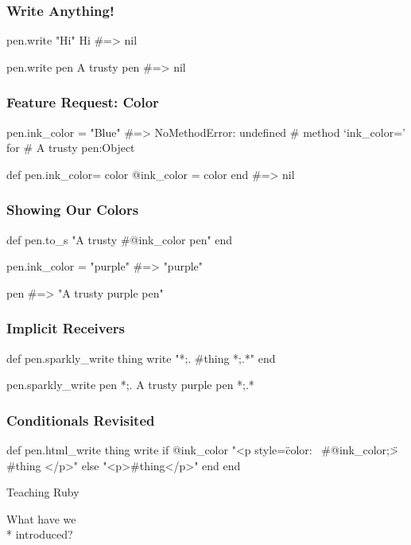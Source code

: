 \documentclass[20pt]{beamer}
\begin{document}
\begin{frame}[fragile]
\frametitle{Write Anything!}
\begin{rubycode}
pen.write "Hi"
Hi
#=> nil

pen.write pen
A trusty pen
#=> nil
\end{rubycode}
\end{frame}

\begin{frame}[fragile]
\frametitle{Feature Request: Color}
\begin{rubycode}
pen.ink_color = "Blue"
#=> NoMethodError: undefined
# method `ink_color=' for
# A trusty pen:Object

def pen.ink_color= color
  @ink_color = color
end
#=> nil
\end{rubycode}
\end{frame}

\begin{frame}[fragile]
\frametitle{Showing Our Colors}
\begin{rubycode}
def pen.to_s
  "A trusty #{@ink_color} pen"
end

pen.ink_color = "purple"
#=> "purple"

pen
#=> "A trusty purple pen"
\end{rubycode}
\end{frame}

\begin{frame}[fragile]
\frametitle{Implicit Receivers}
\begin{rubycode}
def pen.sparkly_write thing
  write "*;. #{thing} *;.*"
end

pen.sparkly_write pen
*;. A trusty purple pen *;.*
\end{rubycode}
\end{frame}

\begin{frame}[fragile]
\frametitle{Conditionals Revisited}
\begin{rubycode}
def pen.html_write thing
  write if @ink_color
    "<p style=\"color: \
    #{@ink_color};\">
      #{thing}
    </p>"
  else
    "<p>#{thing}</p>"
  end
end
\end{rubycode}
\end{frame}

{
\begin{frame}
\par { Teaching Ruby}\par
\vspace{3cm}\hfill
{What have we\\* \hfill introduced?}
\end{frame}
}
\end{document}
